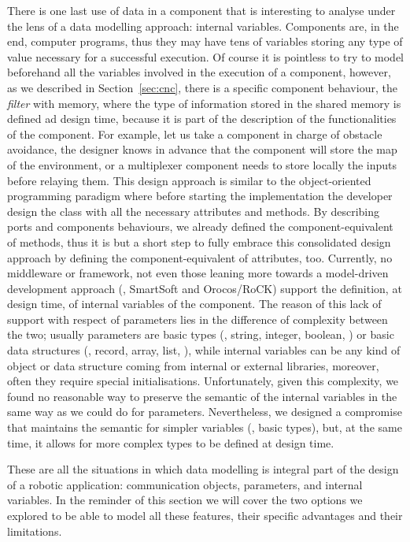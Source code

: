 There is one last use of data in a component that is interesting to analyse under the lens of a data modelling approach: internal variables. Components are, in the end, computer programs, thus they may have tens of variables storing any type of value necessary for a successful execution. Of course it is pointless to try to model beforehand all the variables involved in the execution of a component, however, as we described in Section~\ref{sec:cnc}, there is a specific component behaviour, the \textit{filter} with memory, where the type of information stored in the shared memory is defined ad design time, because it is part of the description of the functionalities of the component. For example, let us take a component in charge of obstacle avoidance, the designer knows in advance that the component will store the map of the environment, or a multiplexer component needs to store locally the inputs before relaying them. This design approach is similar to the object-oriented programming paradigm where before starting the implementation the developer design the class with all the necessary attributes and methods. By describing ports and components behaviours, we already defined the component-equivalent of methods, thus it is but a short step to fully embrace this consolidated design approach by defining the component-equivalent of attributes, too. Currently, no middleware or framework, not even those leaning more towards a model-driven development approach (\ie, SmartSoft and Orocos/RoCK) support the definition, at design time, of internal variables of the component. The reason of this lack of support with respect of parameters lies in the difference of complexity between the two; usually parameters are basic types (\eg, string, integer, boolean, \etc) or basic data structures (\eg, record, array, list, \etc), while internal variables can be any kind of object or data structure coming from internal or external libraries, moreover, often they require special initialisations. Unfortunately, given this complexity, we found no reasonable way to preserve the semantic of the internal variables in the same way as we could do for parameters. Nevertheless, we designed a compromise that maintains the semantic for simpler variables (\ie, basic types), but, at the same time, it allows for more complex types to be defined at design time.

These are all the situations in which data modelling is integral part of the design of a robotic application: communication objects, parameters, and internal variables. In the reminder of this section we will cover the two options we explored to be able to model all these features, their specific advantages and their limitations.

